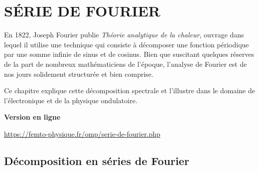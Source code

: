 \setchapterpreamble[u]{\margintoc}
\chapter{SÉRIE DE FOURIER}

En 1822, Joseph Fourier publie \emph{Théorie analytique de la chaleur}, ouvrage dans lequel il utilise une technique qui consiste à décomposer une fonction périodique par une somme infinie de sinus et de cosinus. Bien que suscitant quelques réserves de la part de nombreux mathématiciens de l'époque, l'analyse de Fourier est de nos jours solidement structurée et bien comprise. 

Ce chapitre explique cette décomposition spectrale et l'illustre dans le domaine de l'électronique et de la physique ondulatoire.

\begin{center}
\textbf{Version en ligne}

	\url{https://femto-physique.fr/omp/serie-de-fourier.php}
\end{center}



\section[Séries de Fourier]{Décomposition en séries de Fourier}%

